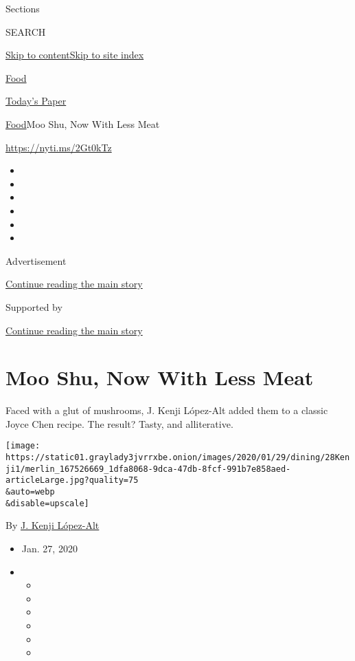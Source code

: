 Sections

SEARCH

\protect\hyperlink{site-content}{Skip to
content}\protect\hyperlink{site-index}{Skip to site index}

\href{https://www.nytimes3xbfgragh.onion/section/food}{Food}

\href{https://myaccount.nytimes3xbfgragh.onion/auth/login?response_type=cookie\&client_id=vi}{}

\href{https://www.nytimes3xbfgragh.onion/section/todayspaper}{Today's
Paper}

\href{/section/food}{Food}\textbar{}Moo Shu, Now With Less Meat

\url{https://nyti.ms/2Gt0kTz}

\begin{itemize}
\item
\item
\item
\item
\item
\item
\end{itemize}

Advertisement

\protect\hyperlink{after-top}{Continue reading the main story}

Supported by

\protect\hyperlink{after-sponsor}{Continue reading the main story}

\hypertarget{moo-shu-now-with-less-meat}{%
\section{Moo Shu, Now With Less Meat}\label{moo-shu-now-with-less-meat}}

Faced with a glut of mushrooms, J. Kenji López-Alt added them to a
classic Joyce Chen recipe. The result? Tasty, and alliterative.

\texttt{[image: https://static01.graylady3jvrrxbe.onion/images/2020/01/29/dining/28Kenji1/merlin\_167526669\_1dfa8068-9dca-47db-8fcf-991b7e858aed-articleLarge.jpg?quality=75\\\&auto=webp\\\&disable=upscale]}

By \href{https://www.nytimes3xbfgragh.onion/by/j-kenji-lopez-alt}{J.
Kenji López-Alt}

\begin{itemize}
\item
  Jan. 27, 2020
\item
  \begin{itemize}
  \item
  \item
  \item
  \item
  \item
  \item
  \end{itemize}
\end{itemize}

